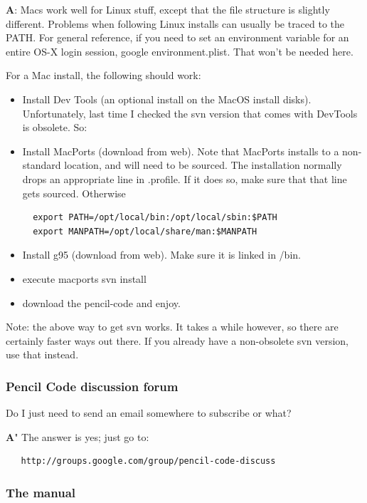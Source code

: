 \documentclass[\mydriver,12pt,twoside,notitlepage,a4paper]{article}
\begin{document}
{\bf A}: Macs work well for Linux stuff, except that the file structure is
slightly different. Problems when following Linux installs can usually be
traced to the PATH. For general reference, if you need to set an environment
variable for an entire OS-X login session, google environment.plist. That won't
be needed here.

For a Mac install, the following should work:

\begin{itemize}
\item[a)]
Install Dev Tools (an optional install on the MacOS install disks).
Unfortunately, last time I checked the svn version that comes with DevTools
is obsolete. So:
\item[b)]
Install MacPorts (download from web). Note that MacPorts installs to a
non-standard location, and will need to be sourced. The installation
normally drops an appropriate line in .profile. If it does so, make sure
that that line gets sourced. Otherwise

\begin{Verbatim}
  export PATH=/opt/local/bin:/opt/local/sbin:$PATH
  export MANPATH=/opt/local/share/man:$MANPATH
\end{Verbatim}

\item[c)]
Install g95 (download from web). Make sure it is linked in /bin.
\item[d)]
execute macports svn install
\item[e)]
download the pencil-code and enjoy.
\end{itemize}

Note: the above way to get svn works. It takes a while however, so there
are certainly faster ways out there. If you already have a non-obsolete svn
version, use that instead.

\subsubsection{Pencil Code discussion forum}

Do I just need to send an email somewhere to subscribe or what?

\medskip

{\bf A}" The answer is yes; just go to:
\begin{Verbatim}
   http://groups.google.com/group/pencil-code-discuss
\end{Verbatim}

\subsubsection{The manual}
\end{document}
